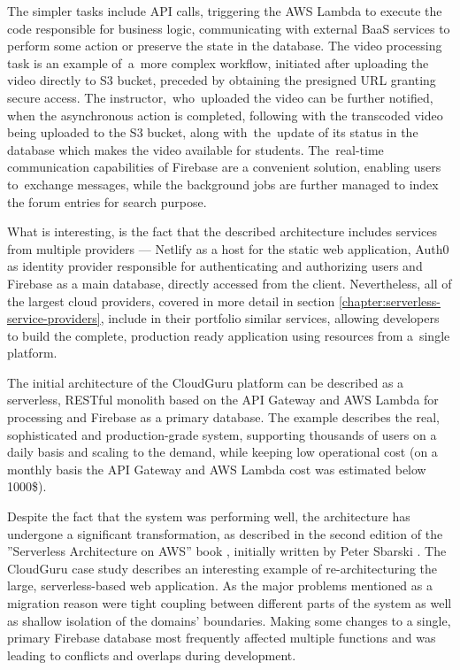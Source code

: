 The simpler tasks include API calls, triggering the AWS Lambda to execute the code responsible for business logic, communicating with external BaaS services to perform some action or preserve the state in the database.
The video processing task is an example of~a~more complex workflow, initiated after uploading the video directly to S3 bucket, preceded by obtaining the presigned URL granting secure access.
The instructor,~who~uploaded the video can be further notified, when the asynchronous action is completed, following with the transcoded video being uploaded to the S3 bucket, along with~the~update of its status in the database which makes the video available for students.
The~real-time communication capabilities of Firebase are a convenient solution, enabling users to~exchange messages, while the background jobs are further managed to index the forum entries for search purpose.

What is interesting, is the fact that the described architecture includes services from multiple providers --- Netlify as a host for the static web application, Auth0 as identity provider responsible for authenticating and authorizing users and Firebase as a main database, directly accessed from the client. Nevertheless, all of the largest cloud providers, covered in more detail in section \ref{chapter:serverless-service-providers}, include in their portfolio similar services, allowing developers to build the complete, production ready application using resources from a~single platform.

The initial architecture of the CloudGuru platform can be described as a serverless, RESTful monolith based on the API Gateway and AWS Lambda for processing and Firebase as a primary database.
The example describes the real, sophisticated and production-grade system, supporting thousands of users on a daily basis and scaling to the demand, while keeping low operational cost (on a monthly basis the API Gateway and AWS Lambda cost was estimated below 1000\$).

Despite the fact that the system was performing well, the architecture has undergone a significant transformation, as described in the second edition of the ''Serverless Architecture on AWS'' book \cite{ServerlessArchitectureOnAWSSecondEdition}, initially written by Peter Sbarski \cite{ServerlessArchitectureOnAWS}.
The CloudGuru case study describes an interesting example of re-architecturing the large, serverless-based web application.
As the major problems mentioned as a migration reason were tight coupling between different parts of the system as well as shallow isolation of the domains' boundaries.
Making some changes to a single, primary Firebase database most frequently affected multiple functions and was leading to conflicts and overlaps during development.


